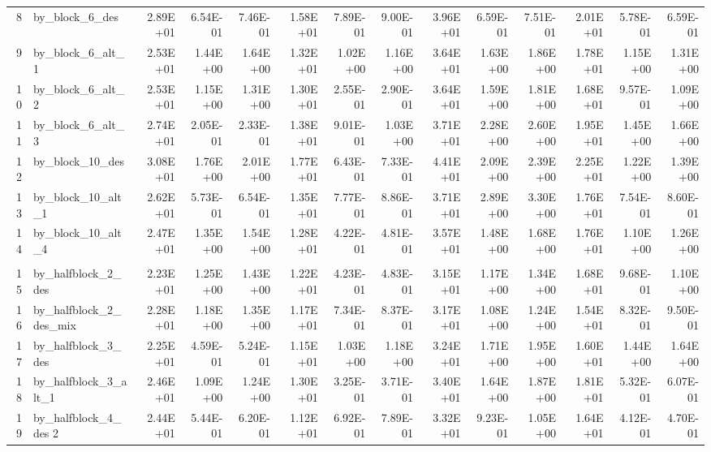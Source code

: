 \documentclass[11pt]{article}
\begin{document}
\begin{table}[htbp]
\begin{tabular}{rlrrrrrrrrrrrr}
    8     & by\_block\_6\_des & 2.89E+01 & 6.54E-01 & 7.46E-01 & 1.58E+01 & 7.89E-01 & 9.00E-01 & 3.96E+01 & 6.59E-01 & 7.51E-01 & 2.01E+01 & 5.78E-01 & 6.59E-01 \\
    9     & by\_block\_6\_alt\_1 & 2.53E+01 & 1.44E+00 & 1.64E+00 & 1.32E+01 & 1.02E+00 & 1.16E+00 & 3.64E+01 & 1.63E+00 & 1.86E+00 & 1.78E+01 & 1.15E+00 & 1.31E+00 \\
    10    & by\_block\_6\_alt\_2 & 2.53E+01 & 1.15E+00 & 1.31E+00 & 1.30E+01 & 2.55E-01 & 2.90E-01 & 3.64E+01 & 1.59E+00 & 1.81E+00 & 1.68E+01 & 9.57E-01 & 1.09E+00 \\
    11    & by\_block\_6\_alt\_3 & 2.74E+01 & 2.05E-01 & 2.33E-01 & 1.38E+01 & 9.01E-01 & 1.03E+00 & 3.71E+01 & 2.28E+00 & 2.60E+00 & 1.95E+01 & 1.45E+00 & 1.66E+00 \\
    12    & by\_block\_10\_des & 3.08E+01 & 1.76E+00 & 2.01E+00 & 1.77E+01 & 6.43E-01 & 7.33E-01 & 4.41E+01 & 2.09E+00 & 2.39E+00 & 2.25E+01 & 1.22E+00 & 1.39E+00 \\
    13    & by\_block\_10\_alt\_1 & 2.62E+01 & 5.73E-01 & 6.54E-01 & 1.35E+01 & 7.77E-01 & 8.86E-01 & 3.71E+01 & 2.89E+00 & 3.30E+00 & 1.76E+01 & 7.54E-01 & 8.60E-01 \\
    14    & by\_block\_10\_alt\_4 & 2.47E+01 & 1.35E+00 & 1.54E+00 & 1.28E+01 & 4.22E-01 & 4.81E-01 & 3.57E+01 & 1.48E+00 & 1.68E+00 & 1.76E+01 & 1.10E+00 & 1.26E+00 \\
          &       &       &       &       &       &       &       &       &       &       &       &       &  \\
    15    & by\_halfblock\_2\_des & 2.23E+01 & 1.25E+00 & 1.43E+00 & 1.22E+01 & 4.23E-01 & 4.83E-01 & 3.15E+01 & 1.17E+00 & 1.34E+00 & 1.68E+01 & 9.68E-01 & 1.10E+00 \\
    16    & by\_halfblock\_2\_des\_mix & 2.28E+01 & 1.18E+00 & 1.35E+00 & 1.17E+01 & 7.34E-01 & 8.37E-01 & 3.17E+01 & 1.08E+00 & 1.24E+00 & 1.54E+01 & 8.32E-01 & 9.50E-01 \\
    17    & by\_halfblock\_3\_des & 2.25E+01 & 4.59E-01 & 5.24E-01 & 1.15E+01 & 1.03E+00 & 1.18E+00 & 3.24E+01 & 1.71E+00 & 1.95E+00 & 1.60E+01 & 1.44E+00 & 1.64E+00 \\
    18    & by\_halfblock\_3\_alt\_1 & 2.46E+01 & 1.09E+00 & 1.24E+00 & 1.30E+01 & 3.25E-01 & 3.71E-01 & 3.40E+01 & 1.64E+00 & 1.87E+00 & 1.81E+01 & 5.32E-01 & 6.07E-01 \\
    19    & by\_halfblock\_4\_des 2 & 2.44E+01 & 5.44E-01 & 6.20E-01 & 1.12E+01 & 6.92E-01 & 7.89E-01 & 3.32E+01 & 9.23E-01 & 1.05E+00 & 1.64E+01 & 4.12E-01 & 4.70E-01 \\

\end{tabular}
\end{table}
\end{document}
